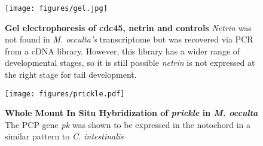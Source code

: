\begin{figure}[tbp]
\centering
\texttt{[image: figures/gel.jpg]}
\caption{\textbf{Gel electrophoresis of cdc45, netrin and controls} \textit{Netrin} was not found in \textit{M. occulta's} transcriptome but was recovered via PCR from a cDNA library. However, this library has a wider range of developmental stages, so it is still possible \textit{netrin} is not expressed at the right stage for tail development.}
\label{fig:gel}
\end{figure}

\begin{figure}[tbp]
\centering
\texttt{[image: figures/prickle.pdf]}
\caption{\textbf{Whole Mount In Situ Hybridization of \textit{prickle} in \textit{M. occulta}} The PCP gene \textit{pk} was shown to be expressed in the notochord in a similar pattern to \textit{C. intestinalis} }
\label{fig:prickle}
\end{figure}
